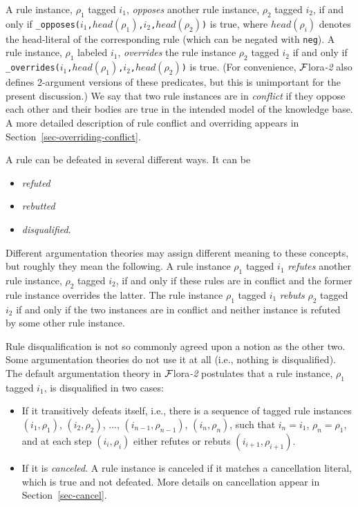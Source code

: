\documentclass[11pt]{article}
\newcommand{\FLORA}{{\mbox{\sc ${\cal F}${lora}\rm\emph{-2}}}\xspace}
\begin{document}
A rule instance, $\rho_1$ tagged $i_1$, \emph{opposes} another rule
instance, $\rho_2$ tagged $i_2$, if and only if
\texttt{\_opposes($i_1$,$head(\rho_1)$,$i_2$,$head(\rho_2)$)} is true,
where $head(\rho_i)$ denotes the head-literal of the corresponding rule
(which can be negated with {\tt neg}). A rule instance, $\rho_1$ labeled
$i_1$, \emph{overrides} the rule instance $\rho_2$ tagged $i_2$ if and
only if \texttt{\_overrides($i_1$,$head(\rho_1)$,$i_2$,$head(\rho_2)$)} is
true. (For convenience, \FLORA also defines 2-argument versions of these
predicates, but this is unimportant for the present discussion.)
We say that two rule instances are in \emph{conflict} if they oppose each other
and their bodies are true in the intended model of the knowledge base.
A more detailed description of rule conflict and overriding appears in
Section~\ref{sec-overriding-conflict}.

A rule can be defeated in several different ways. It can be
\begin{itemize}
\item  \emph{refuted}
\item  \emph{rebutted} 
\item  \emph{disqualified}. 
\end{itemize}
Different argumentation theories may assign different meaning to these
concepts, but roughly they mean the following. A rule instance $\rho_1$
tagged $i_1$ \emph{refutes} another rule instance, $\rho_2$ tagged $i_2$, 
if and only if these rules are in conflict and the former rule instance
overrides the latter. The rule instance $\rho_1$
tagged $i_1$ \emph{rebuts} $\rho_2$ tagged $i_2$ if and only if the two
instances are in conflict and neither instance is refuted by some other
rule instance.

Rule disqualification is not so commonly agreed upon a notion as the other
two.  Some argumentation theories do not use it at all (i.e., nothing is
disqualified).  The default argumentation theory in \FLORA postulates that a
rule instance, $\rho_1$ tagged $i_1$, is disqualified in two cases:
\begin{itemize}
\item If it transitively defeats itself, i.e., there is a sequence of
  tagged rule instances $(i_1,\rho_1)$, $(i_2,\rho_2)$, ...,
  $(i_{n-1},\rho_{n-1})$, $(i_n,\rho_n)$, such that $i_n=i_1$,
  $\rho_n=\rho_1$, and at each step $(i_i,\rho_i)$ either refutes or rebuts
  $(i_{i+1},\rho_{i+1})$.
\item If it is \emph{canceled}. A rule instance is canceled if it matches a
  cancellation literal, which is true and not defeated. More details on
  cancellation appear in Section~\ref{sec-cancel}.
\end{itemize}
\end{document}
